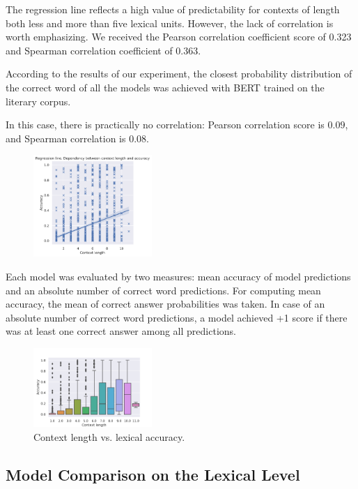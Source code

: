 \documentclass[a4paper]{article}
\begin{document}
The regression line reflects a high value of predictability for contexts of length both less and more than five lexical units. However, the lack of correlation is worth emphasizing. We received the Pearson correlation coefficient score of 0.323 and Spearman correlation coefficient of 0.363.

According to the results of our experiment, the closest probability distribution of the correct word of all the models was achieved with BERT trained on the literary corpus.

In this case, there is practically no correlation: Pearson correlation score is \(0.09\), and Spearman correlation is \(0.08\).

\begin{figure}
\label{fig:context-accuracy-regression}
\centering
\includegraphics[width=0.4\textwidth]{figures/pdf/context-accuracy-regression.pdf}
\end{figure}


Each model was evaluated by two measures: mean accuracy of model predictions and an absolute number of correct word predictions. For computing mean accuracy, the mean of correct answer probabilities was taken. In case of an absolute number of correct word predictions, a model achieved +1 score if there was at least one correct answer among all predictions.

\begin{figure}
\centering
\includegraphics[width=0.4\textwidth]{figures/pdf/context-accuracy-lexical.pdf}
\caption{Context length vs. lexical accuracy.}
\end{figure}

\subsection{Model Comparison on the Lexical Level}
\end{document}
